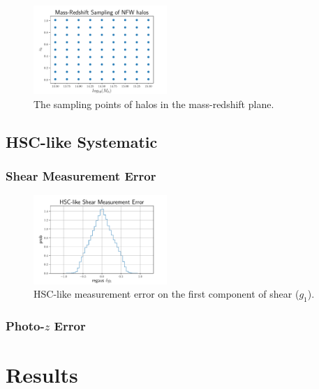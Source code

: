 \documentclass[twocolumn]{aastex62}
\begin{document}
\begin{figure}[!ht]
 \centering
 \includegraphics[width=0.45\textwidth]{mass-redshift-sampling.pdf}
 \caption{The sampling points of halos in the mass-redshift plane.}
 \label{fig:mass-redshift}
\end{figure}

\subsection{HSC-like Systematic}
\subsubsection{Shear Measurement Error}
\begin{figure}[!ht]
 \centering
 \includegraphics[width=0.45\textwidth]{shapeMeasurementError-HSCY1.pdf}
 \caption{HSC-like measurement error on the first component of shear ($g_1$).}
 \label{fig:mass-redshift}
\end{figure}

\subsubsection{Photo-$z$ Error}

\section{Results}
\label{sec:Res}
\end{document}

